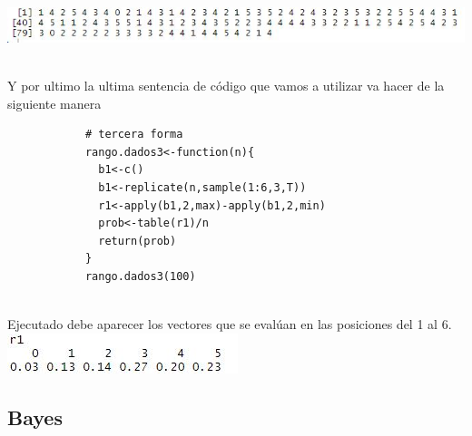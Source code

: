 \documentclass[12pt,hidelinks]{article}
\begin{document}
            \centering
            \includegraphics[scale=1]{probabilidad_condicionada1.JPG}
            \centering
            \caption{}
        \\
        Y por ultimo la ultima sentencia de código que vamos a utilizar va hacer de la siguiente manera \\
        \begin{lstlisting}
            # tercera forma
            rango.dados3<-function(n){
              b1<-c()
              b1<-replicate(n,sample(1:6,3,T))
              r1<-apply(b1,2,max)-apply(b1,2,min)
              prob<-table(r1)/n
              return(prob)
            }
            rango.dados3(100)
        \end{lstlisting}\\
        Ejecutado debe aparecer los vectores que se evalúan en las posiciones del 1 al 6.\\
        
        
            \centering
            \includegraphics[scale=1]{probabilidad_condicionada2.JPG}\\
            \centering
            \caption{}
            
            
	\subsection{Bayes}
\end{document}

